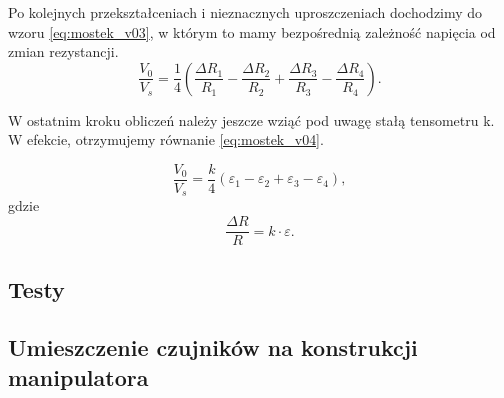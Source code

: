 \documentclass[printmode]{mgr}
\begin{document}
Po kolejnych przekształceniach i nieznacznych uproszczeniach dochodzimy do wzoru \ref{eq:mostek_v03}, w którym to
mamy bezpośrednią zależność napięcia od zmian rezystancji.
\begin{equation}
\frac{V_0}{V_s} = \frac{1}{4}(\frac{\Delta R_1}{R_1} - \frac{\Delta R_2}{R_2} + \frac{\Delta R_3}{R_3} - \frac{\Delta R_4}{R_4}).
\label{eq:mostek_v03}
\end{equation}

W ostatnim kroku obliczeń należy jeszcze wziąć pod uwagę stałą tensometru k. W efekcie, otrzymujemy równanie \ref{eq:mostek_v04}.

\begin{equation}
\frac{V_0}{V_s} = \frac{k}{4}(\varepsilon_1 - \varepsilon_2 + \varepsilon_3 - \varepsilon_4),
\label{eq:mostek_v04}
\end{equation}
gdzie
\begin{equation}
\frac{\Delta R}{R} = k \cdot \varepsilon.
\label{eq:mostek_v05}
\end{equation}


\subsection{Testy}

\subsection{Umieszczenie czujników na konstrukcji manipulatora}






\appendix
\end{document}
